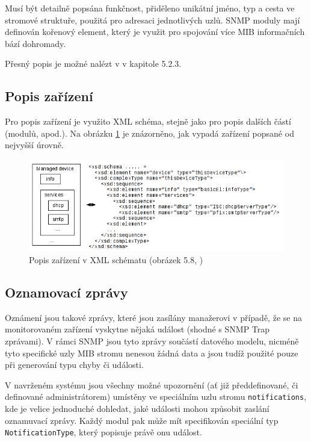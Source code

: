 Musí být detailně popsána funkčnost, přiděleno unikátní jméno, typ a cesta ve stromové struktuře, použitá pro adresaci jednotlivých uzlů. 
SNMP moduly mají definován kořenový element, který je využit pro spojování více MIB informačních bází dohromady.

Přesný popis je možné nalézt v \cite{macejko_dipl} v kapitole 5.2.3.

\subsection{Popis zařízení}
Pro popis zařízení je využito XML schéma, stejně jako pro popis dalších částí (modulů, apod.). Na obrázku \ref{obr_xml_popis_zarizeni} je znázorněno,
jak vypadá zařízení popsané od nejvyšší úrovně. 

\begin{figure}[htp]
	\begin{center}
		\includegraphics[width=15cm]{obrazky/03_popis_zarizeni.png}
		\caption{Popis zařízení v XML schématu (obrázek 5.8, \cite{macejko_dipl})}
		\label{obr_xml_popis_zarizeni}
	\end{center}
\end{figure}

\subsection{Oznamovací zprávy}
Oznámení jsou takové zprávy, které jsou zasílány manažerovi v případě, že se na monitorovaném zařízení vyskytne nějaká událost (shodné s SNMP Trap zprávami).
V rámci SNMP jsou tyto zprávy součástí datového modelu, nicméně tyto specifické uzly MIB stromu nenesou žádná data a jsou tudíž použité pouze při generování typu
chyby či události. 

V navrženém systému jsou všechny možné upozornění (ať již předdefinované, či definované administrátorem) umístěny ve speciálním uzlu stromu \verb|notifications|, 
kde je velice jednoduché dohledat, jaké události mohou způsobit zaslání oznamuvací zprávy. Každý modul pak může mít specifikován speciální typ \verb|NotificationType|,
který popisuje právě onu událost.

